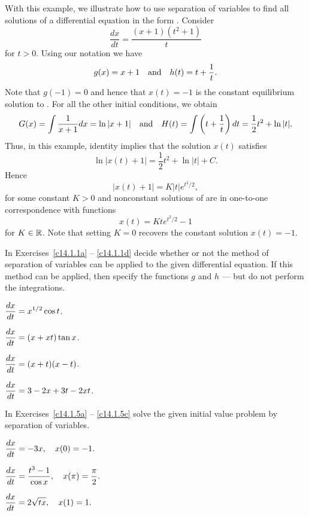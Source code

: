 \documentclass{ximera}
\begin{document}
With this example, we illustrate how to use separation of variables to find 
all solutions of a differential equation in the form .  Consider
\begin{equation} \label{eq:x1t2}
\frac{dx}{dt} = \frac{(x+1)(t^2+1)}{t}
\end{equation}
for $t>0$.  Using our notation we have 
\[
g(x) = x+1 \quad\mbox{and}\quad h(t) = t+\frac{1}{t}.
\]
Note that $g(-1)=0$ and hence that $x(t)=-1$ is the constant equilibrium 
solution to .  For all the other initial conditions, we obtain 
\[
G(x)=\int \frac{1}{x+1} dx = \ln|x+1| \quad\mbox{and}\quad 
H(t) = \int\left(t + \frac{1}{t}\right)dt = \frac{1}{2}t^2 + \ln |t|.
\]
Thus, in this example, identity  implies that the 
solution $x(t)$ satisfies
\[
\ln |x(t)+1| = \frac{1}{2}t^2 + \ln |t| + C.
\]
Hence
\[
|x(t)+1| = K|t|e^{t^2/2},
\]
for some constant $K>0$ and nonconstant solutions of  are in 
one-to-one correspondence with functions
\[
x(t) = Kte^{t^2/2}-1
\]
for $K\in\mbox{$\Bbb{R}$}$.  Note that setting $K=0$ recovers the constant solution 
$x(t)=-1$.

\EXER

\TEXER

\noindent In Exercises~\ref{c14.1.1a} -- \ref{c14.1.1d} decide whether 
or not the method of separation of variables can be applied to the given
differential equation.  If this method can be applied, then specify the 
functions $g$ and $h$ --- but do not perform the integrations.
\begin{exercise} \label{c14.1.1a}
$\displaystyle \frac{dx}{dt} = x^{1/2}\cos t$.
\end{exercise}
\begin{exercise} \label{c14.1.1b}
$\displaystyle \frac{dx}{dt} = (x+xt)\tan x$.
\end{exercise}
\begin{exercise} \label{c14.1.1c}
$\displaystyle \frac{dx}{dt} = (x+t)(x-t)$.
\end{exercise}
\begin{exercise} \label{c14.1.1d}
$\displaystyle \frac{dx}{dt} = 3-2x+3t-2xt$.
\end{exercise}

\noindent In Exercises~\ref{c14.1.5a} -- \ref{c14.1.5c} solve the given 
initial value problem by separation of variables. 
\begin{exercise}  \label{c14.1.5a}
$\displaystyle \frac{dx}{dt} = -3x,\quad x(0)=-1.$
\end{exercise}
\begin{exercise}  \label{c14.1.5b}
$\displaystyle \frac{dx}{dt} = \frac{t^3-1}{\cos x},
\quad x(\pi)=\frac{\pi}{2}.$
\end{exercise}
\begin{exercise}  \label{c14.1.5c}
$\displaystyle \frac{dx}{dt} = 2\sqrt{tx},\quad x(1)=1.$
\end{exercise}
\end{document}
